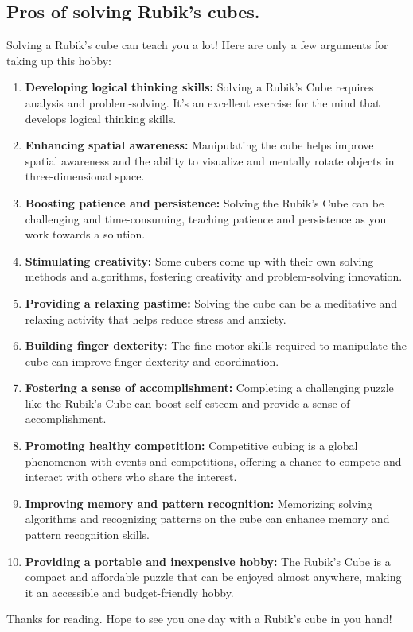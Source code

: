 \subsection{Pros of solving Rubik's cubes.}

Solving a Rubik's cube can teach you a lot! Here are only a few arguments for taking up this hobby:

\begin{enumerate} 
    \item \textbf{Developing logical thinking skills:} Solving a Rubik's Cube requires analysis and problem-solving. It's an excellent exercise for the mind that develops logical thinking skills.
    \item \textbf{Enhancing spatial awareness:} Manipulating the cube helps improve spatial awareness and the ability to visualize and mentally rotate objects in three-dimensional space.
    \item \textbf{Boosting patience and persistence:} Solving the Rubik's Cube can be challenging and time-consuming, teaching patience and persistence as you work towards a solution.
    \item \textbf{Stimulating creativity:} Some cubers come up with their own solving methods and algorithms, fostering creativity and problem-solving innovation.
    \item \textbf{Providing a relaxing pastime:} Solving the cube can be a meditative and relaxing activity that helps reduce stress and anxiety.
    \item \textbf{Building finger dexterity:} The fine motor skills required to manipulate the cube can improve finger dexterity and coordination.
    \item \textbf{Fostering a sense of accomplishment:} Completing a challenging puzzle like the Rubik's Cube can boost self-esteem and provide a sense of accomplishment.
    \item \textbf{Promoting healthy competition:} Competitive cubing is a global phenomenon with events and competitions, offering a chance to compete and interact with others who share the interest.
    \item \textbf{Improving memory and pattern recognition:} Memorizing solving algorithms and recognizing patterns on the cube can enhance memory and pattern recognition skills.
    \item \textbf{Providing a portable and inexpensive hobby:} The Rubik's Cube is a compact and affordable puzzle that can be enjoyed almost anywhere, making it an accessible and budget-friendly hobby.

\end{enumerate}

\vspace{0,5cm}
Thanks for reading. Hope to see you one day with a Rubik's cube in you hand!








